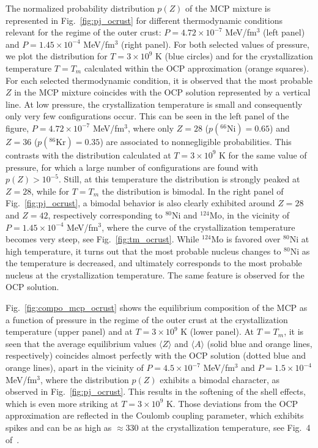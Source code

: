 The normalized probability distribution $p(Z)$ of the MCP mixture is 
represented in Fig.~\ref{fig:pj_ocrust} for different thermodynamic conditions 
relevant for the regime of the outer crust: $P = 4.72\times 10^{-7}$ MeV/fm$^3$
(left panel) and $P=1.45\times 10^{-4}$ MeV/fm$^3$ (right panel). For both 
selected values of pressure, we plot the distribution for $T=3\times
10^9$ K (blue circles) and for the crystallization temperature $T=T_m$ 
calculated within the OCP approximation (orange squares).
For each selected thermodynamic condition, it is observed that the most
probable $Z$ in the MCP mixture coincides with the OCP solution represented by 
a vertical line.
At low pressure, the crystallization temperature is small and consequently only 
very few configurations occur. This can be seen in the left
panel of the figure, $P = 4.72\times 10^{-7}$ MeV/fm$^3$, where only $Z=28$
($p(^{66}\text{Ni}) = 0.65$) and $Z=36$ ($p(^{86}\text{Kr})=0.35$) are 
associated to nonnegligible probabilities. This contrasts with the 
distribution calculated 
at $T=3\times 10^9$ K for the same value of pressure, for which a large number 
of configurations are found with $p(Z) > 10^{-5}$. Still, at this temperature 
the distribution is strongly peaked at $Z=28$, while for $T=T_m$ the 
distribution is bimodal. 
In the right panel of Fig.~\ref{fig:pj_ocrust}, a bimodal behavior is also 
clearly exhibited around $Z=28$ and $Z=42$, respectively corresponding to 
$^{80}$Ni and $^{124}$Mo, in the vicinity of $P = 1.45\times 10^{-4}$ 
MeV/fm$^3$, where the curve of the crystallization temperature becomes very 
steep, see Fig.~\ref{fig:tm_ocrust}. 
While $^{124}$Mo is favored over $^{80}$Ni at high temperature,
it turns out that the most probable nucleus changes to $^{80}$Ni as the
temperature is decreased, and ultimately corresponds to the most probable
nucleus at the crystallization temperature. The same feature is observed for 
the OCP solution.

Fig.~\ref{fig:compo_mcp_ocrust} shows the equilibrium composition of the MCP as
a function of pressure in the regime of the outer crust at the crystallization
temperature (upper panel) and at $T=3\times 10^9$ K (lower panel). At $T=T_m$, 
it is seen that the average equilibrium values $\langle Z\rangle$ and $\langle
A\rangle$ (solid blue and orange lines, respectively) coincides almost 
perfectly with the OCP solution (dotted blue and orange lines), apart in the
vicinity of $P=4.5\times 10^{-7}$ MeV/fm$^3$ and $P=1.5\times 10^{-4}$
MeV/fm$^3$, where the distribution $p(Z)$ exhibits a bimodal character, as
observed in Fig.~\ref{fig:pj_ocrust}. This results in the softening of the 
shell effects, which is even more striking at $T=3\times 10^9$ K. Those 
deviations from the OCP approximation are reflected in the Coulomb coupling 
parameter, which exhibits spikes and can be as high as $\approx 330$ at the
crystallization temperature, see Fig.~4 of~\cite{Fantina2020}.

